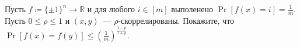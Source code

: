 Пусть $f\coloneqq \{\pm 1\}^n \to \mathbb{R}$ и для любого $i \in [m]$ выполенено $\Pr[f(x) = i] =
\frac{1}{m}$. Пусть $0 \le \rho \le 1$ и $(x, y)$~--- $\rho$-скоррелированы. Покажите, что $\Pr[f(x) =
f(y)] \le \left(\frac{1}{m}\right)^{\frac{1 - \rho}{1 + \rho}}$. 
